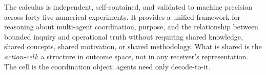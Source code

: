 \documentclass[11pt,a4paper]{article}
\begin{document}
The calculus is independent, self-contained, and validated to machine
precision across forty-five numerical experiments. It provides a
unified framework for reasoning about multi-agent coordination,
purpose, and the relationship between bounded inquiry and operational
truth without requiring shared knowledge, shared concepts,
shared motivation, or shared methodology. What is shared is the
\emph{action-cell}: a structure in outcome space, not in any
receiver's representation. The cell is the coordination object;
agents need only decode-to-it.



\end{document}
